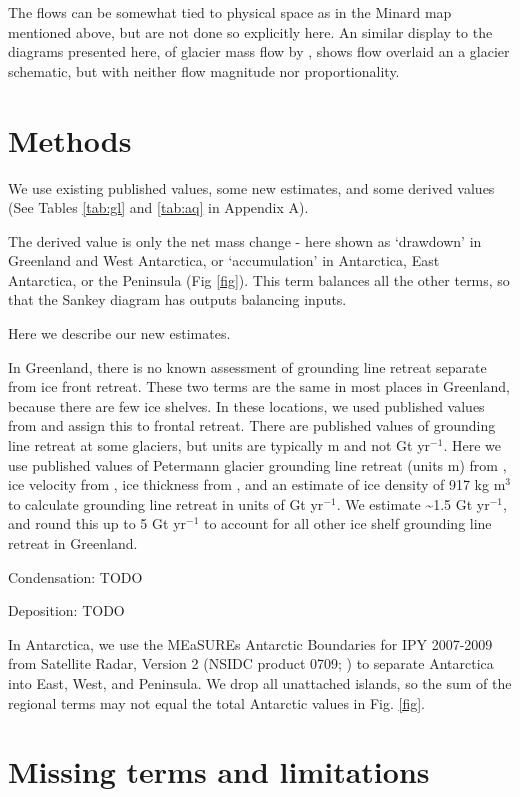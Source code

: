 \documentclass[jog]{igs}
\begin{document}
  The flows can be somewhat tied to physical space as in the Minard map mentioned above, but are not done so explicitly here. An similar display to the diagrams presented here, of glacier mass flow by \citet[Fig. 2]{cogley_2011}, shows flow overlaid an a glacier schematic, but with neither flow magnitude nor proportionality.

\section{Methods}

We use existing published values, some new estimates, and some derived values (See Tables \ref{tab:gl} and \ref{tab:aq} in Appendix A).

The derived value is only the net mass change - here shown as `drawdown' in Greenland and West Antarctica, or `accumulation' in Antarctica, East Antarctica, or the Peninsula (Fig \ref{fig}). This term balances all the other terms, so that the Sankey diagram has outputs balancing inputs.

Here we describe our new estimates.

In Greenland, there is no known assessment of grounding line retreat separate from ice front retreat. These two terms are the same in most places in Greenland, because there are few ice shelves. In these locations, we used published values from \citet{kochtitzky_2023} and assign this to frontal retreat. There are published values of grounding line retreat at some glaciers, but units are typically m and not Gt yr$^{-1}$. Here we use published values of Petermann glacier grounding line retreat (units m) from \citet{millan_2022}, ice velocity from \citet{millan_2022}, ice thickness from \citet{ciraci_2023}, and an estimate of ice density of 917 kg m$^{3}$ to calculate grounding line retreat in units of Gt yr$^{-1}$. We estimate \sim 1.5 Gt yr$^{-1}$, and round this up to 5 Gt yr$^{-1}$ to account for all other ice shelf grounding line retreat in Greenland.

Condensation: TODO

Deposition: TODO

In Antarctica, we use the MEaSUREs Antarctic Boundaries for IPY 2007-2009 from Satellite Radar, Version 2 (NSIDC product 0709; \citet{mouginot_2017,rignot_2013}) to separate Antarctica into East, West, and Peninsula. We drop all unattached islands, so the sum of the regional terms may not equal the total Antarctic values in Fig. \ref{fig}.

\section{Missing terms and limitations}
\label{sec:limits}
\end{document}
